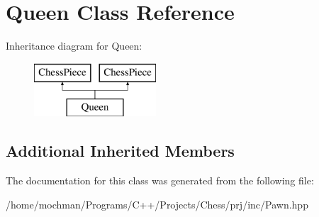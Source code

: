 \hypertarget{class_queen}{\section{Queen Class Reference}
\label{class_queen}
}
Inheritance diagram for Queen\-:\begin{figure}[H]
\begin{center}
\leavevmode
\includegraphics[height=2.000000cm]{class_queen}
\end{center}
\end{figure}
\subsection*{Additional Inherited Members}


The documentation for this class was generated from the following file\-:\begin{DoxyCompactItemize}
\item 
/home/mochman/\-Programs/\-C++/\-Projects/\-Chess/prj/inc/Pawn.\-hpp\end{DoxyCompactItemize}
